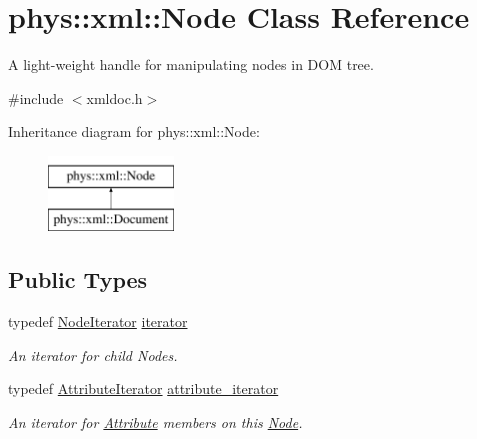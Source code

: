 \hypertarget{classphys_1_1xml_1_1Node}{
\section{phys::xml::Node Class Reference}
\label{d7/d0a/classphys_1_1xml_1_1Node}
}


A light-\/weight handle for manipulating nodes in DOM tree.  




{\ttfamily \#include $<$xmldoc.h$>$}

Inheritance diagram for phys::xml::Node:\begin{figure}[H]
\begin{center}
\leavevmode
\includegraphics[height=2.000000cm]{d7/d0a/classphys_1_1xml_1_1Node}
\end{center}
\end{figure}
\subsection*{Public Types}
\begin{DoxyCompactItemize}
\item 
\hypertarget{classphys_1_1xml_1_1Node_a1b84d9f01a7c786aae85bf365aa5fd7a}{
typedef \hyperlink{classphys_1_1xml_1_1NodeIterator}{NodeIterator} \hyperlink{classphys_1_1xml_1_1Node_a1b84d9f01a7c786aae85bf365aa5fd7a}{iterator}}
\label{d7/d0a/classphys_1_1xml_1_1Node_a1b84d9f01a7c786aae85bf365aa5fd7a}

\begin{DoxyCompactList}\small\item\em An iterator for child Nodes. \item\end{DoxyCompactList}\item 
\hypertarget{classphys_1_1xml_1_1Node_a80e590c48449971c999e50a371a3b504}{
typedef \hyperlink{classphys_1_1xml_1_1AttributeIterator}{AttributeIterator} \hyperlink{classphys_1_1xml_1_1Node_a80e590c48449971c999e50a371a3b504}{attribute\_\-iterator}}
\label{d7/d0a/classphys_1_1xml_1_1Node_a80e590c48449971c999e50a371a3b504}

\begin{DoxyCompactList}\small\item\em An iterator for \hyperlink{classphys_1_1xml_1_1Attribute}{Attribute} members on this \hyperlink{classphys_1_1xml_1_1Node}{Node}. \item\end{DoxyCompactList}\end{DoxyCompactItemize}
